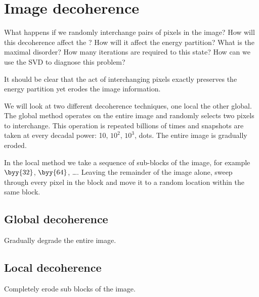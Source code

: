 \section{Image decoherence}
What happens if we randomly interchange pairs of pixels in the image? How will this decoherence affect the \asvd? How will it affect the energy partition? What is the maximal disorder? How many iterations are required to this state? How can we use the SVD to diagnose this problem?

It should be clear that the act of interchanging pixels exactly preserves the energy partition yet erodes the image information.

We will look at two different decoherence techniques, one local the other global. The global method operates on the entire image and randomly selects two pixels to interchange. This operation is repeated billions of times and snapshots are taken at every decadal power: 10, $10^{2}$, $10^{3}$, dots. The entire image is gradually eroded.

In the local method we take a sequence of sub-blocks of the image, for example $\byy{32}$, $\byy{64}$, \dots. Leaving the remainder of the image alone, sweep through every pixel in the block and move it to a random location within the same block.

\subsection{Global decoherence}
Gradually degrade the entire image.
%


\subsection{Local decoherence}
Completely erode sub blocks of the image.
%



